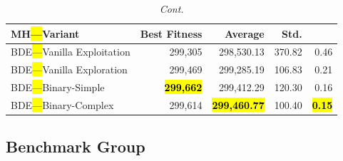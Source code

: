 \documentclass[mathematics,article,accept,moreauthors]{Definitions/mdpi}
\begin{document}
\begin{table}[H]\ContinuedFloat
\caption{\textit{Cont.}}
  \small
  \label{tab:calidad_mknapcb3_29}
  \begin{tabularx}{\textwidth}{lRRRR}
    \toprule
    \textbf{MH\hl{---}Variant} &
    \textbf{Best Fitness} &
    \textbf{Average} &
    \textbf{Std.} &
    \textbf{} \\
    \midrule



    BDE\hl{---}Vanilla Exploitation  &         299,305 &        298,530.13 & 370.82 &         0.46 \\
    BDE\hl{---}Vanilla Exploration   &         299,469 &        299,285.19 & 106.83 &         0.21 \\
    BDE\hl{---}Binary-Simple         & \textbf{\hl{299,662}} &        299,412.29 & 120.30 &         0.16 \\
    BDE\hl{---}Binary-Complex        &         299,614 & \textbf{\hl{299,460.77}} & 100.40 & \textbf{\hl{0.15}} \\
    \bottomrule
  \end{tabularx}
\end{table}

\subsection{Benchmark Group }

\vspace{-9pt}
\end{document}
